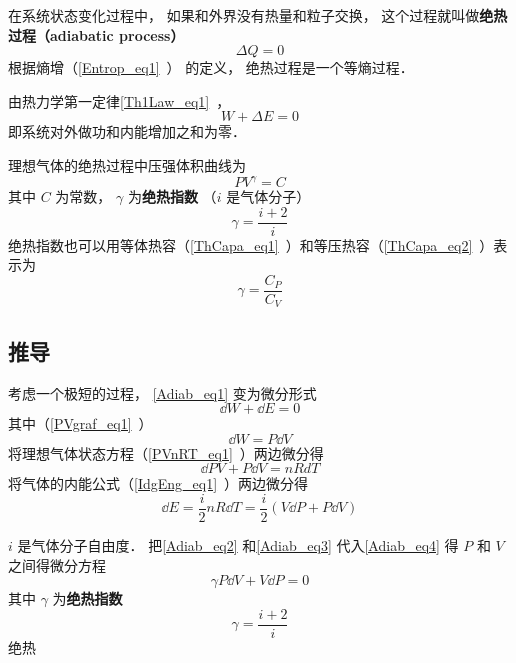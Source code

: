 

在系统状态变化过程中， 如果和外界没有热量和粒子交换， 这个过程就叫做\textbf{绝热过程（adiabatic process）}
\begin{equation}
\Delta Q = 0
\end{equation}
根据熵增（\autoref{Entrop_eq1}~） 的定义， 绝热过程是一个等熵过程．

由热力学第一定律\autoref{Th1Law_eq1}~，
\begin{equation}\label{Adiab_eq1}
W + \Delta E = 0
\end{equation}
即系统对外做功和内能增加之和为零．

理想气体的绝热过程中压强体积曲线为
\begin{equation}\label{Adiab_eq5}
P V^\gamma = C
\end{equation}
其中 $C$ 为常数， $\gamma$ 为\textbf{绝热指数} （$i$ 是气体分子）
\begin{equation}
\gamma = \frac{i+2}{i}
\end{equation}
绝热指数也可以用等体热容（\autoref{ThCapa_eq1}~）和等压热容（\autoref{ThCapa_eq2}~）表示为
\begin{equation}
\gamma = \frac{C_P}{C_V}
\end{equation}

\subsection{推导}
考虑一个极短的过程， \autoref{Adiab_eq1} 变为微分形式
\begin{equation}\label{Adiab_eq4}
\dd{W} + \dd{E} = 0
\end{equation}
其中（\autoref{PVgraf_eq1}~）
\begin{equation}\label{Adiab_eq2}
\dd{W} = P\dd{V}
\end{equation}
将理想气体状态方程（\autoref{PVnRT_eq1}~）两边微分得
\begin{equation}
\dd{P}V + P\dd{V} = nRdT
\end{equation}
将气体的内能公式（\autoref{IdgEng_eq1}~）两边微分得
\begin{equation}\label{Adiab_eq3}
\dd{E} = \frac{i}{2}n R\dd{T} = \frac{i}{2} (V\dd{P} + P\dd{V})
\end{equation}


$i$ 是气体分子自由度． 把\autoref{Adiab_eq2} 和\autoref{Adiab_eq3} 代入\autoref{Adiab_eq4} 得 $P$ 和 $V$ 之间得微分方程
\begin{equation}
\gamma P\dd{V} + V \dd{P} = 0
\end{equation}
其中 $\gamma$ 为\textbf{绝热指数}
\begin{equation}
\gamma = \frac{i+2}{i}
\end{equation}
绝热

